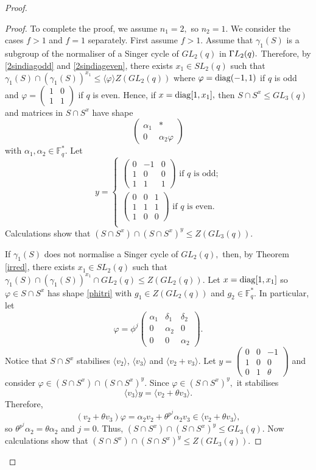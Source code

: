 \begin{proof}
\begin{proof}
To complete the proof, we assume  $n_1=2,$ so $n_2=1.$ We consider the cases  $f>1$ and $f=1$ separately. First assume $f>1.$ Assume that $\gamma_1(S)$ is a subgroup of the normaliser of a Singer cycle of $GL_2(q)$ in ${{\Gamma L}}_2(q).$ Therefore, by \eqref{2sindiagodd} and \eqref{2sindiageven}, there exists $x_1 \in SL_2(q)$ such that $\gamma_1(S) \cap (\gamma_1(S))^{x_1} \le \langle \varphi \rangle Z(GL_2(q))$ where $\varphi = \mathrm{diag}(-1,1)$ if $q$ is odd and $\varphi = \begin{pmatrix}
1 & 0\\
1 & 1
\end{pmatrix}$ if $q$ is even. Hence, if $x=\mathrm{diag}[1,x_1],$ then $S \cap S^x \le GL_3(q)$ and matrices in $S \cap S^x$ have shape 
$$
 \begin{pmatrix}
\alpha_1 & *\\
0 & \alpha_2 \varphi
\end{pmatrix}
$$ with $\alpha_1, \alpha_2 \in \mathbb{F}_q^*.$ Let 
$$
y=
\begin{cases}
\begin{pmatrix}
0&-1&0\\
1&0&0\\
1&1&1
\end{pmatrix} \text{ if $q$ is odd;}\\
\begin{pmatrix}
0&0&1\\
1&1&1\\
1&0&0
\end{pmatrix} \text{ if $q$ is even.}\\
\end{cases}
$$ Calculations show that $(S \cap S^x) \cap (S \cap S^x)^y \le Z(GL_3(q)).$ 

If $\gamma_1(S)$ does not normalise a Singer cycle of $GL_2(q),$ then, by Theorem \ref{irred}, 
   there exists $x_1 \in SL_2(q)$ such that $\gamma_1(S) \cap (\gamma_1(S))^{x_1} \cap GL_2(q) \le Z(GL_2(q)).$ Let $x=\mathrm{diag}[1,x_1]$ so $\varphi \in S \cap S^x$ has shape \eqref{phitri} with $g_1 \in Z(GL_2(q))$ and $g_2 \in \mathbb{F}_q^*.$ In particular, let 
$$
\varphi = \phi^j
\begin{pmatrix}
\alpha_1 & \delta_1 & \delta_2\\
 0&     \alpha_2 & 0\\
0 & 0& \alpha_2  
\end{pmatrix}.
$$ Notice that $S \cap S^x$ stabilises $\langle v_2\rangle$, $\langle v_3\rangle$ and $\langle v_2+v_3\rangle.$
 Let $y=
\begin{pmatrix}
0&0&-1\\
1&0&0\\
0&1&\theta
\end{pmatrix}$ and consider $\varphi \in (S \cap S^x) \cap (S \cap S^x)^y.$ Since $\varphi \in (S \cap S^x)^y,$ it stabilises $$\langle  v_3 \rangle y= \langle  v_2 + \theta v_3 \rangle.$$ Therefore,
$$(v_2 + \theta v_3)\varphi =  \alpha_2 v_2 + \theta^{p^j} \alpha_2 v_3 \in \langle  v_2 + \theta v_3 \rangle,$$
so $\theta^{p^j} \alpha_2= \theta \alpha_2$ and $j=0$. Thus, $(S \cap S^x) \cap (S \cap S^x)^y \le GL_3(q).$ Now calculations  show that $(S \cap S^x) \cap (S \cap S^x)^y \le Z(GL_3(q)).$
  

\end{proof}
\end{proof}
